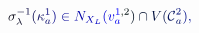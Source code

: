 \documentclass[12pt]{article}
\begin{document}
\makeatletter
\renewcommand*{\@textcolor}[3]{%
  \protect\leavevmode
  \begingroup
    \color#1{#2}#3%
  \endgroup
}
\makeatother
\begin{displaymath}
\mathcolor[RGB]{0,0,15}{\sigma} _ { \mathcolor[RGB]{0,0,30}{\lambda} } ^ { \mathcolor[RGB]{0,0,45}{-} \mathcolor[RGB]{0,0,60}{1} } \mathcolor[RGB]{0,0,75}{(} \mathcolor[RGB]{0,0,90}{\kappa} _ { \mathcolor[RGB]{0,0,105}{a} } ^ { \mathcolor[RGB]{0,0,120}{1} } \mathcolor[RGB]{0,0,135}{)} \mathcolor[RGB]{0,0,150}{\in} \mathcolor[RGB]{0,0,165}{N} _ { \mathcolor[RGB]{0,0,180}{X} _ { \mathcolor[RGB]{0,0,195}{L} } } \mathcolor[RGB]{0,0,210}{(} \mathcolor[RGB]{0,0,225}{v} _ { \mathcolor[RGB]{0,0,240}{a} } ^ { \mathcolor[RGB]{0,0,255}{1} \mathcolor[RGB]{0,15,0}{,} \mathcolor[RGB]{0,15,15}{2} } \mathcolor[RGB]{0,15,30}{)} \mathcolor[RGB]{0,15,45}{\cap} \mathcolor[RGB]{0,15,60}{V} \mathcolor[RGB]{0,15,75}{(} \mathcal { \mathcolor[RGB]{0,15,90}{C} } _ { \mathcolor[RGB]{0,15,105}{a} } ^ { \mathcolor[RGB]{0,15,120}{2} } \mathcolor[RGB]{0,15,135}{)} \mathcolor[RGB]{0,15,150}{,}
\end{displaymath}
\end{document}
